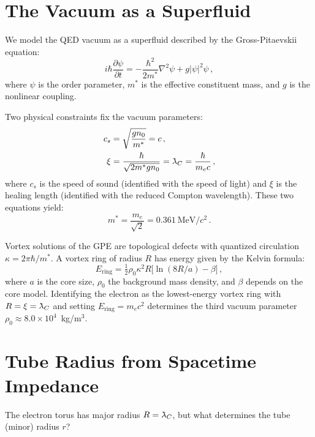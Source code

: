 \documentclass[11pt,a4paper]{article}
\newcommand{\lambdabar}{\mkern0.75mu\mathchar'26\mkern-9.75mu\lambda}
\begin{document}
\section{The Vacuum as a Superfluid}
\label{sec:superfluid}

We model the QED vacuum as a superfluid described by the
Gross-Pitaevskii equation:
\begin{equation}
  i\hbar\frac{\partial\psi}{\partial t}
  = -\frac{\hbar^2}{2m^*}\nabla^2\psi + g|\psi|^2\psi\,,
  \label{eq:gpe}
\end{equation}
where $\psi$ is the order parameter, $m^*$ is the effective
constituent mass, and $g$ is the nonlinear coupling.

Two physical constraints fix the vacuum parameters:
\begin{align}
  c_s &= \sqrt{\frac{g n_0}{m^*}} = c\,,
  \label{eq:cs}
  \\
  \xi &= \frac{\hbar}{\sqrt{2 m^* g n_0}}
       = \lambdabar_C = \frac{\hbar}{m_e c}\,,
  \label{eq:xi}
\end{align}
where $c_s$ is the speed of sound (identified with the speed of light)
and $\xi$ is the healing length (identified with the reduced Compton
wavelength).  These two equations yield:
\begin{equation}
  m^* = \frac{m_e}{\sqrt{2}} = 0.361~\text{MeV}/c^2\,.
  \label{eq:mstar}
\end{equation}

Vortex solutions of the GPE are topological defects with quantized
circulation $\kappa = 2\pi\hbar/m^*$.  A vortex ring of radius $R$
has energy given by the Kelvin formula:
\begin{equation}
  E_{\text{ring}} = \tfrac{1}{2}\rho_0\kappa^2 R
  \bigl[\ln(8R/a) - \beta\bigr]\,,
  \label{eq:kelvin}
\end{equation}
where $a$ is the core size, $\rho_0$ the background mass density,
and $\beta$ depends on the core model.  Identifying the electron as
the lowest-energy vortex ring with $R = \xi = \lambdabar_C$ and
setting $E_{\text{ring}} = m_e c^2$ determines the third vacuum
parameter $\rho_0 \approx 8.0 \times 10^4$~kg/m$^3$.


\section{Tube Radius from Spacetime Impedance}
\label{sec:tube}

The electron torus has major radius $R = \lambdabar_C$, but what
determines the tube (minor) radius $r$?
\end{document}
